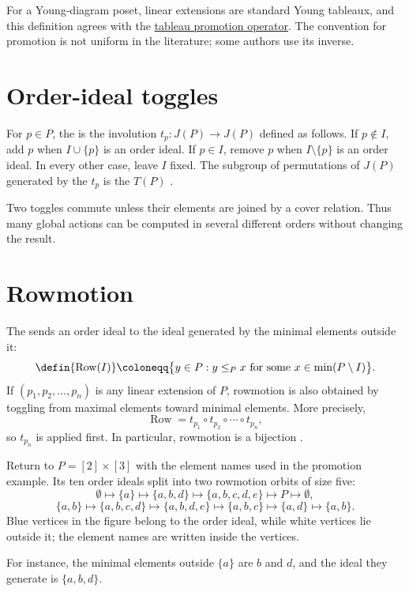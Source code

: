 For a Young-diagram poset, linear extensions are standard Young tableaux,
and this definition agrees with the
\hyperref[tableauPromotion]{tableau promotion operator}.  The convention for
promotion is not uniform in the literature; some authors use its inverse.

\section[orderIdealToggles]{Order-ideal toggles}

For $p\in P$, the \label{orderIdealToggle} is the
involution $t_p:J(P)\to J(P)$ defined as follows.  If $p\notin I$, add $p$
when $I\cup\{p\}$ is an order ideal.  If $p\in I$, remove $p$ when
$I\setminus\{p\}$ is an order ideal.  In every other case, leave $I$ fixed.
The subgroup of permutations of $J(P)$ generated by the $t_p$ is the
 $T(P)$ \cite{StrikerWilliams2012}.

Two toggles commute unless their elements are joined by a cover relation.
Thus many global actions can be computed in several different orders without
changing the result.

\section[rowmotion]{Rowmotion}

The  sends an order ideal to the ideal generated
by the minimal elements outside it:
\[
  \defin{\operatorname{Row}(I)}
  \coloneqq
  \bigl\{y\in P:y\leq_P x
  \text{ for some }x\in\min(P\setminus I)\bigr\}.
\]
If $(p_1,p_2,\dotsc,p_n)$ is any linear extension of $P$, rowmotion is also
obtained by toggling from maximal elements toward minimal elements.  More
precisely,
\[
  \operatorname{Row}
  =t_{p_1}\circ t_{p_2}\circ\dotsm\circ t_{p_n},
\]
so $t_{p_n}$ is applied first.  In particular, rowmotion is a bijection
\cite{StrikerWilliams2012}.

\begin{example*}
Return to $P=[2]\times[3]$ with the element names used in the promotion
example.  Its ten order ideals split into two rowmotion orbits of size five:
\[
  \emptyset\longmapsto\{a\}\longmapsto\{a,b,d\}
  \longmapsto\{a,b,c,d,e\}\longmapsto P\longmapsto\emptyset,
\]
\[
  \{a,b\}\longmapsto\{a,b,c,d\}\longmapsto\{a,b,d,e\}
  \longmapsto\{a,b,c\}\longmapsto\{a,d\}\longmapsto\{a,b\}.
\]
Blue vertices in the figure belong to the order ideal, while white vertices
lie outside it; the element names are written inside the vertices.
\begin{figure}
\end{figure}
For instance, the minimal elements outside $\{a\}$ are $b$ and $d$, and the
ideal they generate is $\{a,b,d\}$.
\end{example*}

